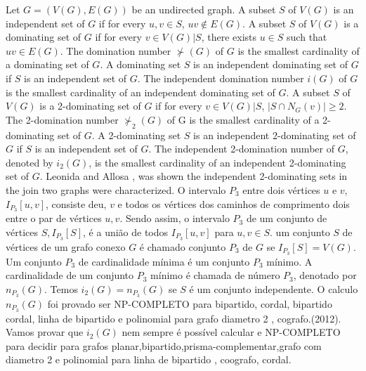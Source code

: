 \documentclass[a4paper,8pt]{article}
\theoremstyle{plain}
\begin{document}
Let $G = (V(G),E(G))$ be an undirected graph. A subset $S$ of $V(G)$ is an independent set of $G$ if for every $u,v \in S$, $uv \notin E(G)$. A subset $S$ of $V(G)$ is a dominating set of $G$ if for every $v \in V (G)|S$, there exists $u \in S$ such that $uv \in E(G)$. The domination number $\nsucc(G)$ of $G$ is the smallest cardinality of a dominating set of $G$. A dominating set $S$ is an independent dominating set of $G$ if $S$ is an independent set of $G$. The independent domination number $i(G)$ of $G$ is the smallest cardinality of an independent dominating set of $G$. A subset $S$ of $V(G)$ is a 2-dominating set of $G$ if for every $v \in V (G)|S$, $|S \cap N_G(v)|\geq 2$. The 2-domination number $\nsucc_2(G)$ of G is the smallest cardinality of a 2-dominating set of $G$. A 2-dominating set $S$ is an independent 2-dominating set of $G$ if $S$ is an independent set of $G$. The independent 2-domination number of $G$, denoted by $i_2(G)$, is the smallest cardinality of an independent 2-dominating set of $G$.   Leonida and  Allosa \cite{leonida2018independent}, was shown the independent 2-dominating sets in the join two graphs were characterized. O intervalo $P_3$ entre dois vértices $u$ e $v$, $I_{P_3}[u,v]$, consiste deu, $v$ e todos os vértices dos caminhos de comprimento dois entre o par de vértices $u,v$.  Sendo assim, o intervalo $P_3$ de um conjunto de vértices $S,I_{P_3}[S]$, é a união de todos $I_{P_3}[u,v]$ para $u,v\in S$. um conjunto $S$ de vértices de um grafo conexo $G$ é chamado conjunto $P_3$ de $G$ se $I_{P_3}[S] =V(G)$. Um conjunto $P_3$ de cardinalidade mínima é um conjunto $P_3$ mínimo. A cardinalidade de um conjunto $P_3$ mínimo é chamada de número $P_3$, denotado por $n_{P_3}(G)$. Temos $i_2(G)=n_{P_3}(G)$ se $S$ é um conjunto independente. O calculo $n_{P_3}(G)$ foi provado ser NP-COMPLETO para bipartido, cordal, bipartido cordal, linha de bipartido e polinomial para grafo diametro 2 , cografo.\cite{CENTENO}(2012). Vamos provar que  
$i_2(G)$ nem sempre é possível calcular e NP-COMPLETO para decidir para grafos planar,bipartido,prisma-complementar,grafo com diametro 2 e polinomial para linha de bipartido , coografo, cordal.
 

  
 
\end{document}
